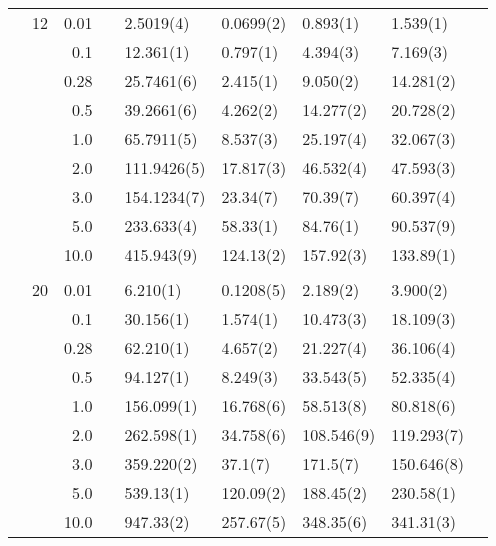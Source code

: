 \begin{table}[H]
\begin{tabularx}{\textwidth}{R{1cm}rrcR{2.3cm}R{2.3cm}R{2.3cm}R{2.3cm}R{1cm}}
		&12 & 0.01 && 2.5019(4) & 0.0699(2) & 0.893(1) & 1.539(1) \\
		&& 0.1 && 12.361(1) & 0.797(1) & 4.394(3) & 7.169(3) \\
		&& 0.28 && 25.7461(6) & 2.415(1) & 9.050(2) & 14.281(2) \\
		&& 0.5 && 39.2661(6) & 4.262(2) & 14.277(2) & 20.728(2) \\
		&& 1.0 && 65.7911(5) & 8.537(3) & 25.197(4) & 32.067(3) \\
		&& 2.0 && 111.9426(5) & 17.817(3) & 46.532(4) & 47.593(3) \\
		&& 3.0 && 154.1234(7) & 23.34(7) & 70.39(7) & 60.397(4) \\ 
		&& 5.0 && 233.633(4) & 58.33(1) & 84.76(1) & 90.537(9) \\
		&& 10.0 && 415.943(9) & 124.13(2) & 157.92(3) & 133.89(1) \\
		\hdashline \\
		
		&20 & 0.01 && 6.210(1) & 0.1208(5) & 2.189(2) & 3.900(2) \\
		&& 0.1 && 30.156(1) & 1.574(1) & 10.473(3) & 18.109(3) \\
		&& 0.28 && 62.210(1) & 4.657(2) & 21.227(4) & 36.106(4) \\
		&& 0.5 && 94.127(1) & 8.249(3) & 33.543(5) & 52.335(4) \\
		&& 1.0 && 156.099(1) & 16.768(6) & 58.513(8) & 80.818(6) \\
		&& 2.0 && 262.598(1) & 34.758(6) & 108.546(9) & 119.293(7) \\
		&& 3.0 && 359.220(2) & 37.1(7) & 171.5(7) & 150.646(8) \\ 
		&& 5.0 && 539.13(1) & 120.09(2) & 188.45(2) & 230.58(1) \\
		&& 10.0 && 947.33(2) & 257.67(5) & 348.35(6) & 341.31(3) \\
		\hline \hline
	\end{tabularx}
\end{table} 

